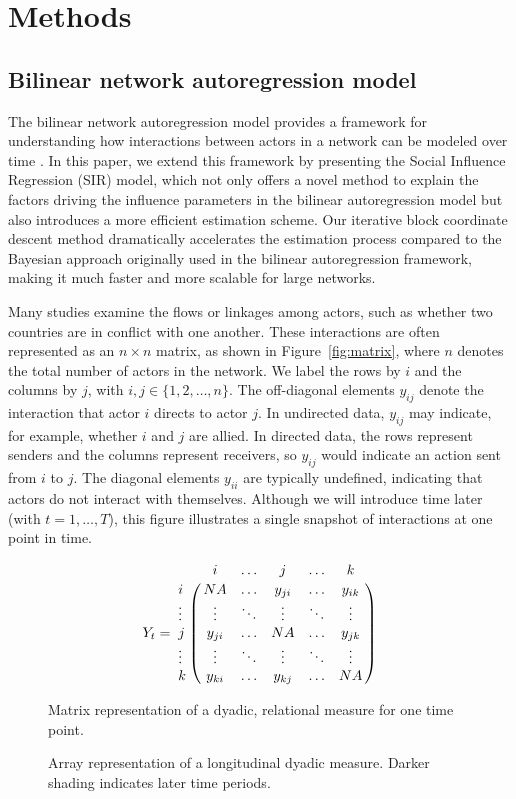 \section*{\textbf{Methods}}

\subsection*{Bilinear network autoregression model}

The bilinear network autoregression model provides a framework for understanding how interactions between actors in a network can be modeled over time \citep{minhas:etal:2016}. In this paper, we extend this framework by presenting the Social Influence Regression (SIR) model, which not only offers a novel method to explain the factors driving the influence parameters in the bilinear autoregression model but also introduces a more efficient estimation scheme. Our iterative block coordinate descent method dramatically accelerates the estimation process compared to the Bayesian approach originally used in the bilinear autoregression framework, making it much faster and more scalable for large networks.

Many studies examine the flows or linkages among actors, such as whether two countries are in conflict with one another. These interactions are often represented as an $n \times n$ matrix, as shown in Figure~\ref{fig:matrix}, where $n$ denotes the total number of actors in the network. We label the rows by $i$ and the columns by $j$, with $i,j \in \{1,2,\dots,n\}$. The off-diagonal elements $y_{ij}$ denote the interaction that actor $i$ directs to actor $j$. In undirected data, $y_{ij}$ may indicate, for example, whether $i$ and $j$ are allied. In directed data, the rows represent senders and the columns represent receivers, so $y_{ij}$ would indicate an action sent from $i$ to $j$. The diagonal elements $y_{ii}$ are typically undefined, indicating that actors do not interact with themselves. Although we will introduce time later (with $t=1,\ldots,T$), this figure illustrates a single snapshot of interactions at one point in time.

\begin{figure}[ht]
\centering
\begin{minipage}{.45\textwidth}
	\begin{equation*}
	Y_{t} = \bbordermatrix{
		~ & i  & \ldots & j & \ldots & k \cr
		i & NA  & \ldots & y_{ji} & \ldots & y_{ik} \cr
		\vdots & \vdots & \ddots & \vdots & \ddots & \vdots  \cr
		j & y_{ji}  & \ldots & NA  & \ldots & y_{jk} \cr
		\vdots & \vdots & \ddots & \vdots & \ddots & \vdots \cr
		k & y_{ki}  & \ldots & y_{kj}  & \ldots & NA \cr
		}
	\end{equation*}
	\caption{Matrix representation of a dyadic, relational measure for one time point.}
	\label{fig:matrix}
\end{minipage}
\begin{minipage}{0.45\textwidth}
	\centering
	\resizebox{.7\textwidth}{!}{}
	\caption{Array representation of a longitudinal dyadic measure. Darker shading indicates later time periods.}
	\label{fig:tensViz}
\end{minipage}
\end{figure}


